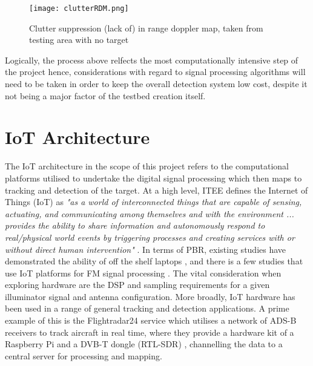 \begin{figure}[htbp]
    \centering
    \texttt{[image: clutterRDM.png]}
    \caption{Clutter suppression (lack of) in range doppler map, taken from testing area with no target}
    \label{fig:clutter}
\end{figure}


\noindent Logically, the process above relfects the most computationally intensive step of the project hence, considerations with regard to signal processing algorithms will need to be taken in order to keep the overall detection system low cost, despite it not being a major factor of the testbed creation itself. 


\section{IoT Architecture}

The IoT architecture in the scope of this project refers to the computational platforms utilised to undertake the digital signal processing which then maps to tracking and detection of the target. At a high level, ITEE defines the Internet of Things (IoT) as \textit{"as a world of interconnected things that are capable of sensing, actuating, and communicating among themselves and with the environment ... provides the ability to share information and autonomously respond to real/physical world events by triggering processes and creating services with or without direct human intervention"} \cite{IoTdefinition}. In terms of PBR, existing studies have demonstrated the ability of off the shelf laptops \cite{FMlowCost}, and there is a few studies that use IoT platforms for FM signal processing \cite{IOTpassiveRadar}. The vital consideration when exploring hardware are the DSP and sampling requirements for a given illuminator signal and antenna configuration. More broadly, IoT hardware has been used in a range of general tracking and detection applications. A prime example of this is the Flightradar24 service which utilises a network of ADS-B receivers to track aircraft in real time, where they provide a hardware kit of a Raspberry Pi and a DVB-T dongle (RTL-SDR) \cite{flightradar24}, channelling the data to a central server for processing and mapping. 


